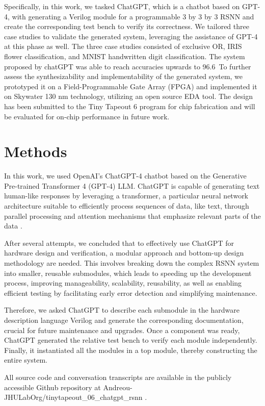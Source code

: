 Specifically, in this work, we tasked ChatGPT, which is a chatbot based on GPT-4, with generating a Verilog module for a programmable 3 by 3 by 3 RSNN and create the corresponding test bench to verify its correctness.
We tailored three case studies to validate the generated system, leveraging the assistance of GPT-4 at this phase as well. 
The three case studies consisted of exclusive OR, IRIS flower classification, and MNIST handwritten digit classification. The system proposed by chatGPT was able to reach accuracies upwards to 96.6\
To further assess the synthesizability and implementability of the generated system, we prototyped it on a Field-Programmable Gate Array (FPGA) and implemented it on Skywater 130 nm technology, utilizing an open source EDA tool.
The design has been submitted to the Tiny Tapeout 6 program for chip fabrication and will be evaluated for on-chip performance in future work. 


\section{Methods}

In this work, we used OpenAI's ChatGPT-4 chatbot based on the Generative Pre-trained Transformer 4 (GPT-4) LLM.
ChatGPT is capable of generating text human-like responses by leveraging a transformer, a particular neural network architecture suitable to efficiently process sequences of data, like text, through parallel processing and attention mechanisms that emphasize relevant parts of the data \cite{2017_transformers}.

After several attempts, we concluded that to effectively use ChatGPT for hardware design and verification, a modular approach and bottom-up design methodology are needed.
This involves breaking down the complex RSNN system into smaller, reusable submodules, which leads to speeding up the development process, improving manageability, scalability, reusability, as well as enabling efficient testing by facilitating early error detection and simplifying maintenance.

Therefore, we asked ChatGPT to describe each submodule in the hardware description language Verilog and generate the corresponding documentation, crucial for future maintenance and upgrades.
Once a component was ready, ChatGPT generated the relative test bench to verify each module independently.
Finally, it instantiated all the modules in a top module, thereby constructing the entire system.

All source code and conversation transcripts are available in the publicly accessible Github repository at Andreou-JHULabOrg/tinytapeout\_06\_chatgpt\_rsnn \cite{tinytapeout_06_chatgpt_rsnn}.


